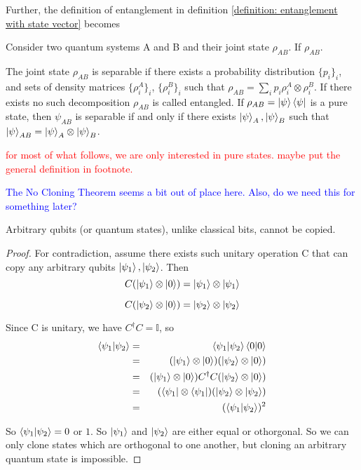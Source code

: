 
\bigskip
Further, the definition of entanglement in definition \ref{definition: entanglement with state vector} becomes 
\begin{definition}[Entanglement]
 Consider two quantum systems A and B and their joint state $\rho_{AB}$. If $\rho_{AB}$.
 
 The joint state $\rho_{AB}$ is separable if there exists a probability distribution $\{p_i\}_i$, and sets of density matrices $\{\rho_i^A\}_i$, $\{\rho_i^B\}_i$ such that $\rho_{AB}=\sum_i p_i\rho_i^A\otimes\rho_i^B$.
 If there exists no such decomposition $\rho_{AB}$ is called entangled.
 If $\rho_{AB}=\ket{\psi}\bra{\psi}$ is a pure state, then $\psi_{AB}$ is separable if and only if there exists $\ket{\psi}_A, \ket{\psi}_B$ such that $\ket{\psi}_{AB}=\ket{\psi}_A \otimes \ket{\psi}_B$.
\end{definition}

\textcolor{red}{for most of what follows, we are only interested in pure states. maybe put the general definition in footnote.}

\textcolor{blue}{The No Cloning Theorem seems a bit out of place here.  Also, do we need this for something later?}
\begin{theorem} \label{no-cloning thm}
Arbitrary qubits (or quantum states), unlike classical bits, cannot be copied. 
\end{theorem} 

\begin{proof} \cite{Wehner:notes}
For contradiction, assume there exists such unitary operation C that can copy any arbitrary qubits $\ket{\psi_1}, \ket{\psi_2}$. Then
\begin{equation*}
    C(\ket{\psi_1} \otimes \ket{0})=\ket{\psi_1} \otimes \ket{\psi_1}
\end{equation*}

\begin{equation*}
C(\ket{\psi_2} \otimes \ket{0})=\ket{\psi_2} \otimes \ket{\psi_2}  
\end{equation*}
    

Since C is unitary, we have $C^\dagger C=\mathbb{I}$, so
\begin{eqnarray*}
\braket{\psi_1|\psi_2}&=&\braket{\psi_1|\psi_2}\braket{0|0}\\
&=&(\ket{\psi_1} \otimes \ket{0})(\ket{\psi_2} \otimes \ket{0})\\
&=&(\ket{\psi_1} \otimes \ket{0})C^\dagger C(\ket{\psi_2} \otimes \ket{0})\\
&=&(\bra{\psi_1} \otimes \bra{\psi_1})(\ket{\psi_2} \otimes \ket{\psi_2})\\
&=&(\braket{\psi_1 |\psi_2})^2
\end{eqnarray*}

So $\braket{\psi_1 | \psi_2}=0$ or $1$. So $\ket{\psi_1}$ and $\ket{\psi_2}$ are either equal or othorgonal. So we can only clone states which are orthogonal to one another, but cloning an arbitrary quantum state is impossible. 
\end{proof}